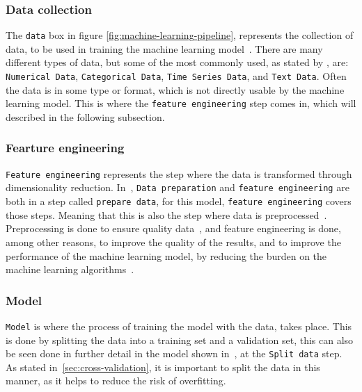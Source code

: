 \subsubsection{Data collection}\label{subsubsec:machine-learning-pipeline-data-collection}
The \texttt{data} box in figure \ref{fig:machine-learning-pipeline}, represents the collection of data, to be used in training the machine learning model~\cite{machine-learning-pipeline-architecture}. There are many different types of data, but some of the most commonly used, as stated by \cite{the-importance-of-machine-learning-data}, are: \texttt{Numerical Data}, \texttt{Categorical Data}, \texttt{Time Series Data}, and \texttt{Text Data}. Often the data is in some type or format, which is not directly usable by the machine learning model. This is where the \texttt{feature engineering} step comes in, which will described in the following subsection. 

\subsubsection{Fearture engineering}\label{subsubsec:machine-learning-pipeline-feature-engineering}
\texttt{Feature engineering} represents the step where the data is transformed through dimensionality reduction. In~\cite{machine-learning-pipeline-architecture}, \texttt{Data preparation} and \texttt{feature engineering} are both in a step called \texttt{prepare data}, for this model, \texttt{feature engineering} covers those steps. Meaning that this is also the step where data is preprocessed~\cite{machine-learning-pipeline-architecture}. Preprocessing is done to ensure quality data~\cite{data-preparation-for-data-mining}, and feature engineering is done, among other reasons, to improve the quality of the results, and to improve the performance of the machine learning model, by reducing the burden on the machine learning algorithms~\cite{dimensionality-reduction-reddy}.

\subsubsection{Model}\label{subsubsec:machine-learning-pipeline-model-training}
\texttt{Model} is where the process of training the model with the data, takes place. This is done by splitting the data into a training set and a validation set, this can also be seen done in further detail in the model shown in~\cite{machine-learning-pipeline-architecture}, at the \texttt{Split data} step. As stated in~\ref{sec:cross-validation}, it is important to split the data in this manner, as it helps to reduce the risk of overfitting. 

